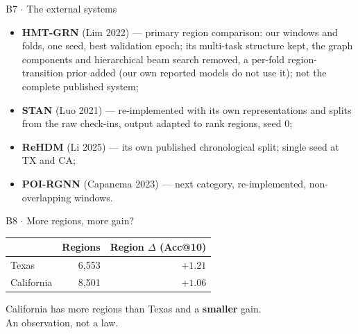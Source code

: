 \documentclass{beamer}
\newcommand{\scite}[1]{{\color{black!60}\footnotesize(#1)}}
\begin{document}
\begin{frame}{B7 $\cdot$ The external systems}
    \vspace{0pt}%
    \small
    \begin{itemize}\setlength{\itemsep}{1.4ex}
        \item \textbf{HMT-GRN} \scite{Lim 2022} --- primary region comparison: our windows and folds,
              one seed, best validation epoch; its multi-task structure kept, the graph components and
              hierarchical beam search removed, a per-fold region-transition prior added (our own
              reported models do not use it); not the complete published system;
        \item \textbf{STAN} \scite{Luo 2021} --- re-implemented with \alert{its own representations
              and splits} from the raw check-ins, output adapted to rank regions, seed 0;
        \item \textbf{ReHDM} \scite{Li 2025} --- its own published chronological split;
              \alert{single seed at TX and CA};
        \item \textbf{POI-RGNN} \scite{Capanema 2023} --- next category, re-implemented,
              non-overlapping windows.
    \end{itemize}
\end{frame}

\begin{frame}{B8 $\cdot$ More regions, more gain?}
    \vspace{0pt}%
    \begin{center}
    \small
    \setlength{\tabcolsep}{9pt}
    \begin{tabular}{@{}lrr@{}}
        \toprule
        & Regions & Region $\Delta$ (Acc@10) \\
        \midrule
        Texas      & 6,553 & $+1.21$ \\
        California & 8,501 & $+1.06$ \\
        \bottomrule
    \end{tabular}
    \end{center}
    \bigskip
    {\centering California has more regions than Texas and a \textbf{smaller} gain.\\
    \alert{An observation, not a law.}\par}
\end{frame}
\end{document}
